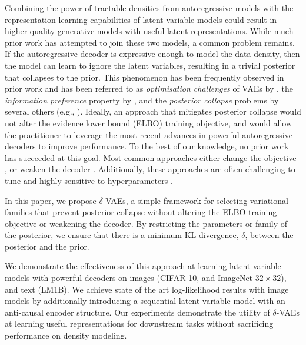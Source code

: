 \documentclass{article} \usepackage{iclr2019_conference,times}
\begin{document}
Combining the power of tractable densities from autoregressive models with the representation learning capabilities of latent variable models could result in higher-quality generative models with useful latent representations. While much prior work has attempted to join these two models, a common problem remains. If the autoregressive decoder is expressive enough to model the data density, then the model can learn to ignore the latent variables, resulting in a trivial posterior that collapses to the prior. 
This phenomenon has been frequently observed in prior work and has been referred to as 
\textit{optimisation challenges} of VAEs by \citet{Bowman2015}, 
the \textit{information preference} property by \citet{VLAE}, and the \textit{posterior collapse} problems by several others (e.g., \citet{VQVAE, SAVAE}). 
Ideally, an approach that mitigates posterior collapse would not alter the evidence lower bound (ELBO) training objective, and would allow the practitioner to leverage the most recent advances in powerful autoregressive decoders to improve performance. To the best of our knowledge, no prior work has succeeded at this goal. Most common approaches either change the objective \citep{betavae, Alemi2017, InfoVAE, VLAE, agave}, or weaken the decoder \citep{Bowman2015, PixelVAE}. Additionally, these approaches are often challenging to tune and highly sensitive to hyperparameters \citep{Alemi2017, VLAE}.

In this paper, we propose $\delta$-VAEs, a simple framework for selecting variational families that prevent posterior collapse without altering the ELBO training objective or weakening the decoder. By restricting the parameters or family of the posterior, we ensure that there is a minimum KL divergence, $\delta$, between the posterior and the prior.

We demonstrate the effectiveness of this approach at learning latent-variable models with powerful decoders on images (CIFAR-10, and ImageNet $32\times 32$), and text (LM1B). We achieve state of the art log-likelihood results with image models by additionally introducing a sequential latent-variable model with an anti-causal encoder structure. Our experiments demonstrate the utility of $\delta$-VAEs at learning useful representations for downstream tasks without sacrificing performance on density modeling.
\end{document}

